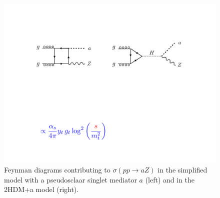 \begin{figure}
\centering
\includegraphics[width=.8\textwidth]{figures/diagrams}
\caption{\label{fig:diagrams} Feynman diagrams contributing to $\sigma(pp \to a Z)$ in the simplified model with a pseudosclaar singlet mediator $a$ (left) and in the 2HDM+a model (right). }
\end{figure}
		

